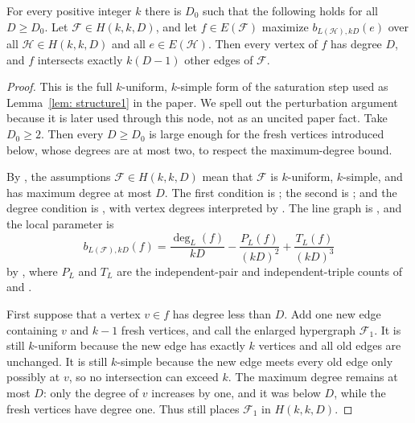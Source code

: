 \begin{lemma}
For every positive integer $k$ there is $D_0$ such that the following holds
for all $D\ge D_0$.  Let $\mathcal F\in H(k,k,D)$, and let
$f\in E(\mathcal F)$ maximize $b_{L(\mathcal H),kD}(e)$ over all
$\mathcal H\in H(k,k,D)$ and all $e\in E(\mathcal H)$.  Then every vertex of
$f$ has degree $D$, and $f$ intersects exactly $k(D-1)$ other edges of
$\mathcal F$.
\end{lemma}
\begin{proof}
This is the full $k$-uniform, $k$-simple form of the saturation step used as
Lemma~\ref{lem: structure1} in the paper.  We spell out the perturbation
argument because it is later used through this node, not as an uncited paper
fact.
Take $D_0\ge 2$.  Then every $D\ge D_0$ is large enough for the fresh
vertices introduced below, whose degrees are at most two, to respect the
maximum-degree bound.

By , the assumptions $\mathcal F\in H(k,k,D)$ mean
that $\mathcal F$ is $k$-uniform, $k$-simple, and has maximum degree at most
$D$.  The first condition is ; the second is
; and the degree condition is
, with vertex degrees interpreted by
.  The line graph is ,
and the local parameter is
\[
b_{L(\mathcal F),kD}(f)
=\frac{\deg_L(f)}{kD}
-\frac{P_L(f)}{(kD)^2}
+\frac{T_L(f)}{(kD)^3}
\]
by , where $P_L$ and $T_L$ are the independent-pair
and independent-triple counts of  and
.

First suppose that a vertex $v\in f$ has degree less than $D$.  Add one new
edge containing $v$ and $k-1$ fresh vertices, and call the enlarged
hypergraph $\mathcal F_1$.  It is still $k$-uniform because the new edge has
exactly $k$ vertices and all old edges are unchanged.  It is still
$k$-simple because the new edge meets every old edge only possibly at $v$,
so no intersection can exceed $k$.  The maximum degree remains at most $D$:
only the degree of $v$ increases by one, and it was below $D$, while the
fresh vertices have degree one.  Thus
 still places $\mathcal F_1$ in $H(k,k,D)$.


\end{proof}

